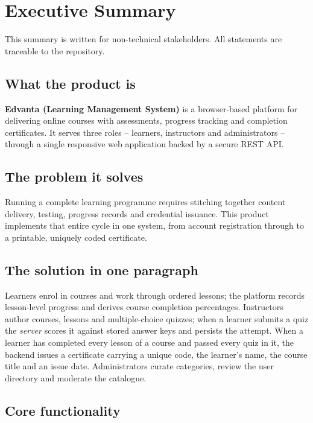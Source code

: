 \section{Executive Summary}
\label{sec:executive-summary}

This summary is written for non-technical stakeholders. All statements are traceable to the repository.

\subsection{What the product is}

\textbf{Edvanta (Learning Management System)} is a browser-based platform for delivering online courses with assessments, progress tracking and completion certificates. It serves three roles -- learners, instructors and administrators -- through a single responsive web application backed by a secure REST API.

\subsection{The problem it solves}

Running a complete learning programme requires stitching together content delivery, testing, progress records and credential issuance. This product implements that entire cycle in one system, from account registration through to a printable, uniquely coded certificate.

\subsection{The solution in one paragraph}

Learners enrol in courses and work through ordered lessons; the platform records lesson-level progress and derives course completion percentages. Instructors author courses, lessons and multiple-choice quizzes; when a learner submits a quiz the \emph{server} scores it against stored answer keys and persists the attempt. When a learner has completed every lesson of a course and passed every quiz in it, the backend issues a certificate carrying a unique code, the learner's name, the course title and an issue date. Administrators curate categories, review the user directory and moderate the catalogue.

\subsection{Core functionality}

